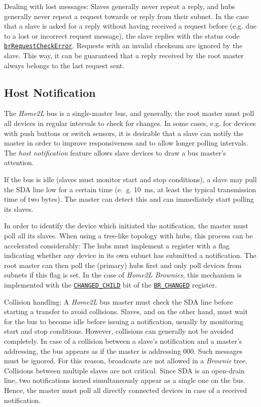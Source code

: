 \documentclass[12pt,english,parskip=half,headheight=19pt]{scrreprt}
\newcommand{\refapic}[1]{\href{home2l-api_c/index.html}{\mbox{\texttt{#1}}}}            %
\begin{document}
Dealing with lost messages: Slaves generally never repeat a reply, and hubs generally never repeat a request towards or reply from their subnet. In the case that a slave is asked for a reply without having received a request before (e.g. due to a lost or incorrect request message), the slave replies with the status code \refapic{brRequestCheckError}. Requests with an invalid checksum are ignored by the slave. This way, it can be guaranteed that a reply received by the root master always belongs to the last request sent.



\subsection{Host Notification}
\label{sec:brownies-bus-notify}

The \textit{Home2L} bus is a single-master bus, and generally, the root master must poll all devices in regular intervals to check for changes. In some cases, e.g. for devices with push buttons or switch sensors, it is desirable that a slave can notify the master in order to improve responsiveness and to allow longer polling intervals. The \textit{host notification} feature allows slave devices to draw a bus master's attention.

If the bus is idle (slaves must monitor start and stop conditions), a slave may pull the SDA line low for a certain time (e.~g. 10~ms, at least the typical transmission time of two bytes). The master can detect this and can immediately start polling its slaves.

In order to identify the device which initiated the notification, the master must poll all its slaves. When using a tree-like topology with hubs, this process can be accelerated considerably: The hubs must implement a register with a flag indicating whether any device in its own subnet has submitted a notification. The root master can then poll the (primary) hubs first and only poll devices from subnets if this flag is set. In the case of \textit{Home2L Brownies}, this mechanism is implemented with the \refapic{CHANGED\_CHILD} bit of the \refapic{BR\_CHANGED} register.

Collision handling: A \textit{Home2L} bus master must check the SDA line before starting a transfer to avoid collisions. Slaves, and on the other hand, must wait for the bus to become idle before issuing a notification, usually by monitoring start and stop conditions. However, collisions can generally not be avoided completely. In case of a collision between a slave's notification and a master's addressing, the bus appears as if the master is addressing 000. Such messages must be ignored. For this reason, broadcasts are not allowed in a \textit{Brownie} tree. Collisions between multiple slaves are not critical. Since SDA is an open-drain line, two notifications issued simultaneously appear as a single one on the bus. Hence, the master must poll all directly connected devices in case of a received notification.
\end{document}
